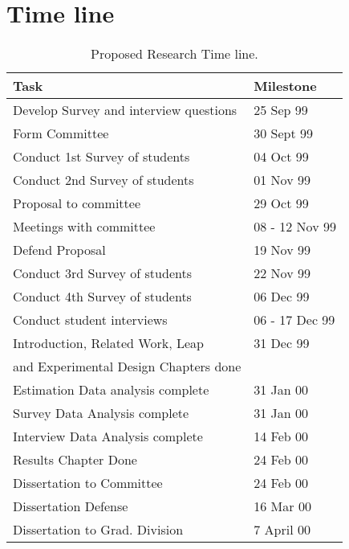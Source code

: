 
\chapter{Time line}
\label{sec:plan}
\begin{center}
  \begin{table}[htbp]
    \caption{Proposed Research Time line.}  
    \begin{tabular}{|l|l|} \hline
      {\bf Task}&{\bf Milestone} \\ \hline
      Develop Survey and interview questions & 25 Sep 99 \\ \hline
      Form Committee & 30 Sept 99 \\ \hline
      Conduct 1st Survey of students & 04 Oct 99 \\ \hline
      Conduct 2nd Survey of students & 01 Nov 99 \\ \hline
      Proposal to committee & 29 Oct 99 \\ \hline
      Meetings with committee & 08 - 12 Nov 99 \\ \hline
      Defend Proposal & 19 Nov 99 \\ \hline
      Conduct 3rd Survey of students & 22 Nov 99 \\ \hline
      Conduct 4th Survey of students & 06 Dec 99 \\ \hline
      Conduct student interviews & 06 - 17 Dec 99 \\ \hline
      Introduction, Related Work, Leap & 31 Dec 99 \\
      and Experimental Design Chapters done &\\ \hline
      Estimation Data analysis complete & 31 Jan 00 \\ \hline
      Survey Data Analysis complete & 31 Jan 00 \\ \hline
      Interview Data Analysis complete & 14 Feb 00 \\ \hline
      Results Chapter Done & 24 Feb 00 \\ \hline
      Dissertation to Committee & 24 Feb 00 \\ \hline
      Dissertation Defense & 16 Mar 00 \\ \hline
      Dissertation to Grad. Division & 7 April 00 \\ \hline
    \end{tabular}
  \end{table}
\end{center}
